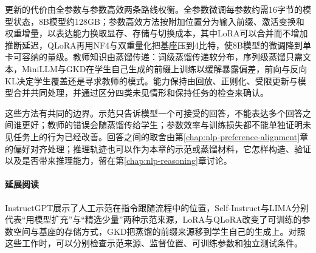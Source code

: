 更新的代价由全参数与参数高效两条路线权衡。全参数微调每参数约需16字节的模型状态，8B模型约128GB；参数高效方法按附加位置分为输入前缀、激活变换和权重增量，以表达能力换取显存、存储与切换成本，其中LoRA可以合并而不增加推断延迟，QLoRA再用NF4与双重量化把基座压到4比特，使8B模型的微调降到单卡可容纳的量级。教师知识由蒸馏传递：词级蒸馏传递软分布，序列级蒸馏只需文本，MiniLLM与GKD在学生自己生成的前缀上训练以缓解暴露偏差，前向与反向KL决定学生覆盖还是寻求教师的模式。能力保持由回放、正则化、受限更新与模型合并共同处理，并通过区分四类未见情形和保持任务的检查来确认。

这些方法有共同的边界。示范只告诉模型一个可接受的回答，不能表达多个回答之间谁更好；教师的错误会随蒸馏传给学生；参数效率与训练损失都不能单独证明未见任务上的行为已经改善。回答之间的取舍由第\ref{chap:nlp-preference-alignment}章的偏好对齐处理；推理轨迹也可以作为本章的示范或蒸馏材料，它怎样构造、验证以及是否带来推理能力，留在第\ref{chap:nlp-reasoning}章讨论。

\paragraph{延展阅读}
InstructGPT展示了人工示范在指令跟随流程中的位置，Self-Instruct与LIMA分别代表“用模型扩充”与“精选少量”两种示范来源，LoRA与QLoRA改变了可训练的参数空间与基座的存储方式，GKD把蒸馏的前缀来源移到学生自己的生成上。对照这些工作时，可以分别检查示范来源、监督位置、可训练参数和独立测试条件。
